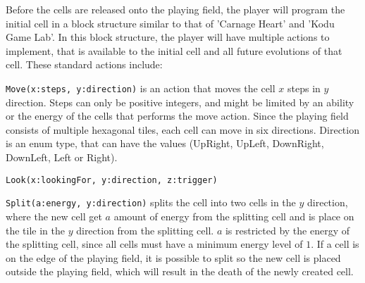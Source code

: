 Before the cells are released onto the playing field, the player will program the initial cell in a block structure similar to that of 'Carnage Heart' and 'Kodu Game Lab'.
In this block structure, the player will have multiple actions to implement, that is available to the initial cell and all future evolutions of that cell.
These standard actions include:\newline

\verb|Move(x:steps, y:direction)| is an action that moves the cell $x$ steps in $y$ direction.
Steps can only be positive integers, and might be limited by an ability or the energy of the cells that performs the move action.
Since the playing field consists of multiple hexagonal tiles, each cell can move in six directions.
Direction is an enum type, that can have the values (UpRight, UpLeft, DownRight, DownLeft, Left or Right).\newline

\verb|Look(x:lookingFor, y:direction, z:trigger)|\newline 



\verb|Split(a:energy, y:direction)| splits the cell into two cells in the $y$ direction, where the new cell get $a$ amount of energy from the splitting cell and is place on the tile in the $y$ direction from the splitting cell.
$a$ is restricted by the energy of the splitting cell, since all cells must have a minimum energy level of $1$.
If a cell is on the edge of the playing field, it is possible to split so the new cell is placed outside the playing field, which will result in the death of the newly created cell.
